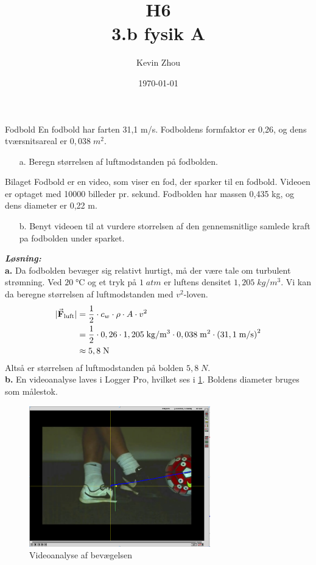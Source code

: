 \documentclass{report}
\title{H6\\
{\Large \textbf{3.b fysik A}}}
\author{Kevin Zhou}
\date{\today}
\newcommand{\sol}{\setlength{\parindent}{0cm}\textbf{\textit{Løsning:}}\setlength{\parindent}{1cm}}
\begin{document}
\maketitle
\begin{question}{Fodbold}{}
  En fodbold har farten 31,1 m/s. Fodboldens formfaktor er 0,26, og dens tværsnitsareal er $0,038 \;\unit{m^2} $. 
  \begin{itemize}
    \item[a.] Beregn størrelsen af luftmodstanden på fodbolden.
  \end{itemize}
Bilaget Fodbold er en video, som viser en fod, der sparker til en fodbold. Videoen er optaget med 10000 billeder pr. sekund. Fodbolden har massen 0,435 kg, og dens diameter er 0,22 m.
\begin{itemize}
  \item[b.] Benyt videoen til at vurdere storrelsen af den gennemsnitlige samlede kraft pa fodbolden under sparket.
\end{itemize}
\end{question}
\sol \\
\textbf{a.}
Da fodbolden bevæger sig relativt hurtigt, må der være tale om turbulent strømning.
Ved $20 \;\unit{\celsius} $ og et tryk på $1 \;\unit{atm} $ er luftens densitet $1,205 \;\unit{kg/m^3} $. 
Vi kan da beregne størrelsen af luftmodstanden med $v^2$-loven.
\begin{equation*}
\begin{split}
  |\va{F} _{\text{luft} }| &= \frac{1}{2} \cdot c_w \cdot \rho \cdot A \cdot v^2\\
  &=\frac{1}{2} \cdot 0,26 \cdot 1,205 \;\unit{kg/m^3} \cdot 0,038 \;\unit{m^2} \cdot \left(31,1 \;\unit{m/s} \right)^2\\
  &\approx 5,8 \;\unit{N}
\end{split}
\end{equation*}
Altså er størrelsen af luftmodstanden på bolden $5,8 \;\unit{N} $. \\[1ex]
\textbf{b.}
En videoanalyse laves i Logger Pro, hvilket ses i \cref{fig:video}.
Boldens diameter bruges som målestok.
\begin{figure}[H]
\begin{center}
  \includegraphics[width=0.7\textwidth]{video-analyse.png}
\end{center}
\caption{Videoanalyse af bevægelsen}
\label{fig:video}
\end{figure}
\end{document}
